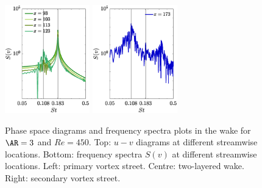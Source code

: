 \begin{figure}
\includegraphics[width=0.328\textwidth]{./fig/appendix/Spec_AR3_Re450_b.eps}
\includegraphics[width=0.328\textwidth]{./fig/appendix/Spec_AR3_Re450_c.eps}
\caption{Phase space diagrams and frequency spectra plots in the wake for $\AR=3$ and $Re=450$. Top: $u-v$ diagrams at different streamwise locations. Bottom: frequency spectra $S(v)$ at different streamwise locations. Left: primary vortex street. Centre: two-layered wake. Right: secondary vortex street.}
\label{fig:wake_AR3}
\end{figure}

